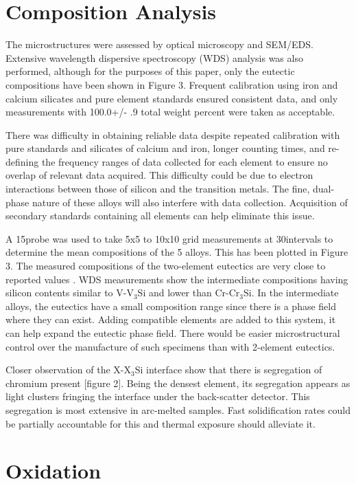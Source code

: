 \documentclass[preprint]{elsarticle}
\begin{document}
\section{Composition Analysis}

The microstructures were assessed by optical microscopy and SEM/EDS. Extensive wavelength dispersive spectroscopy (WDS) analysis was also performed, although for the purposes of this paper, only the eutectic compositions have been shown in Figure 3. Frequent calibration using iron and calcium silicates and pure element standards ensured consistent data, and only measurements with 100.0+/- .9 total weight percent were taken as acceptable. 

There was difficulty in obtaining reliable data despite repeated calibration with pure standards and silicates of calcium and iron, longer counting times, and re-defining the frequency ranges of data collected for each element to ensure no overlap of relevant data acquired. This difficulty could be due to electron interactions between those of silicon and the transition metals. The fine, dual-phase nature of these alloys will also interfere with data collection. Acquisition of secondary standards containing all elements can help eliminate this issue. 

A 15\micro\metre probe was used to take 5x5 to 10x10 grid measurements at 30\micro\metre intervals to determine the mean compositions of the 5 alloys. This has been plotted in Figure 3. The measured compositions of the two-element eutectics are very close to reported values \cite{gokhale90,smith90}. WDS measurements show the intermediate compositions having silicon contents similar to V-V$_3$Si and lower than Cr-Cr$_3$Si. In the intermediate alloys, the eutectics have a small composition range since there is a phase field where they can exist. Adding compatible elements are added to this system, it can help expand the eutectic phase field. There would be easier microstructural control over the manufacture of such specimens than with 2-element eutectics.

Closer observation of the X-X$_3$Si interface show that there is segregation of chromium present [figure 2]. Being the densest element, its segregation appears as light clusters fringing the interface under the back-scatter detector. This segregation is most extensive in arc-melted samples. Fast solidification rates could be partially accountable for this and thermal exposure should alleviate it.  
 

\section{Oxidation}
\end{document}
